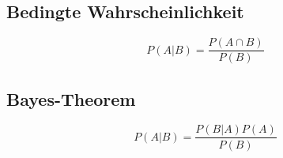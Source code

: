 \subsection{Bedingte Wahrscheinlichkeit}

\begin{equation*}
    P(A|B)=\frac{P(A\cap B)}{P(B)}
\end{equation*}

\subsection{Bayes-Theorem}

\begin{equation*}
    P(A|B)=\frac{P(B|A)P(A)}{P(B)}
\end{equation*}
